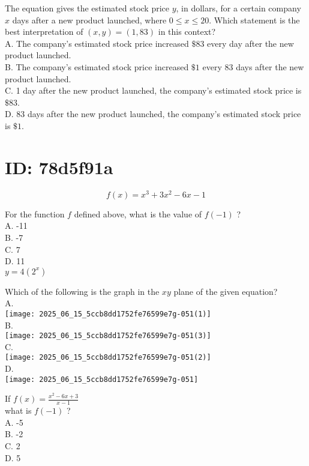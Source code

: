 The equation gives the estimated stock price $y$, in dollars, for a certain company $x$ days after a new product launched, where $0 \leq x \leq 20$. Which statement is the best interpretation of $(x, y)=(1,83)$ in this context?\\
A. The company's estimated stock price increased $\$ 83$ every day after the new product launched.\\
B. The company's estimated stock price increased $\$ 1$ every 83 days after the new product launched.\\
C. 1 day after the new product launched, the company's estimated stock price is $\$ 83$.\\
D. 83 days after the new product launched, the company's estimated stock price is $\$ 1$.

\section*{ID: 78d5f91a}
$$
f(x)=x^{3}+3 x^{2}-6 x-1
$$

For the function $f$ defined above, what is the value of $f(-1)$ ?\\
A. -11\\
B. -7\\
C. 7\\
D. 11\\
$y=4\left(2^{x}\right)$

Which of the following is the graph in the $x y$ plane of the given equation?\\
A.\\
\texttt{[image: 2025\_06\_15\_5ccb8dd1752fe76599e7g-051(1)]}\\
B.\\
\texttt{[image: 2025\_06\_15\_5ccb8dd1752fe76599e7g-051(3)]}\\
C.\\
\texttt{[image: 2025\_06\_15\_5ccb8dd1752fe76599e7g-051(2)]}\\
D.\\
\texttt{[image: 2025\_06\_15\_5ccb8dd1752fe76599e7g-051]}

If $f(x)=\frac{x^{2}-6 x+3}{x-1}$\\
what is $f(-1)$ ?\\
A. -5\\
B. -2\\
C. 2\\
D. 5

